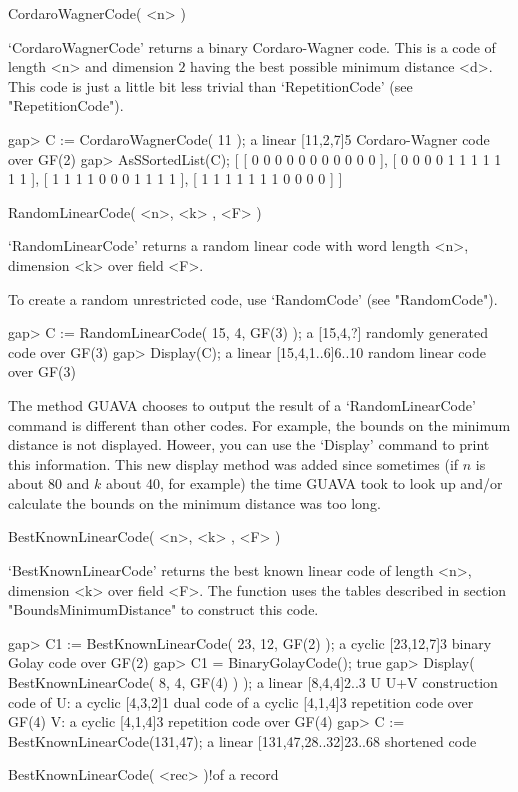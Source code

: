 \>CordaroWagnerCode( <n> )

`CordaroWagnerCode' returns a binary Cordaro-Wagner code.  This is a code
of length <n> and dimension $2$ having the best possible minimum distance
<d>.  This code is  just a little  bit less trivial than `RepetitionCode'
(see "RepetitionCode").

\beginexample
gap> C := CordaroWagnerCode( 11 );
a linear [11,2,7]5 Cordaro-Wagner code over GF(2)
gap> AsSSortedList(C);                 
[ [ 0 0 0 0 0 0 0 0 0 0 0 ], [ 0 0 0 0 1 1 1 1 1 1 1 ], 
  [ 1 1 1 1 0 0 0 1 1 1 1 ], [ 1 1 1 1 1 1 1 0 0 0 0 ] ]
\endexample

\>RandomLinearCode( <n>, <k> , <F> )

`RandomLinearCode'  returns  a random linear  code  with word length <n>,
dimension <k> over field <F>.

To   create a    random  unrestricted   code,   use `RandomCode'     (see
"RandomCode").

\beginexample
gap> C := RandomLinearCode( 15, 4, GF(3) );
a  [15,4,?] randomly generated code over GF(3)
gap> Display(C);
a linear [15,4,1..6]6..10 random linear code over GF(3)
\endexample

The method GUAVA chooses to output the result of a
`RandomLinearCode' command is different than other codes. 
For example, the bounds on the minimum distance is not displayed.
Howeer, you can use the `Display' command to print this information.
This new display method was added since sometimes (if $n$ is about 80 and
$k$ about 40, for example) the time GUAVA took to
look up and/or calculate the bounds on the minimum distance
was too long.

\>BestKnownLinearCode( <n>, <k> , <F> )

`BestKnownLinearCode' returns the best  known linear code of  length <n>,
dimension <k> over field  <F>. The function uses  the tables described in
section "BoundsMinimumDistance" to construct this code.

\beginexample
gap> C1 := BestKnownLinearCode( 23, 12, GF(2) );
a cyclic [23,12,7]3 binary Golay code over GF(2)
gap> C1 = BinaryGolayCode();
true
gap> Display( BestKnownLinearCode( 8, 4, GF(4) ) );
a linear [8,4,4]2..3 U U+V construction code of
U: a cyclic [4,3,2]1 dual code of
   a cyclic [4,1,4]3 repetition code over GF(4)
V: a cyclic [4,1,4]3 repetition code over GF(4)
gap> C := BestKnownLinearCode(131,47);
a linear [131,47,28..32]23..68 shortened code 
\endexample

\>BestKnownLinearCode( <rec> )!{of a record}

